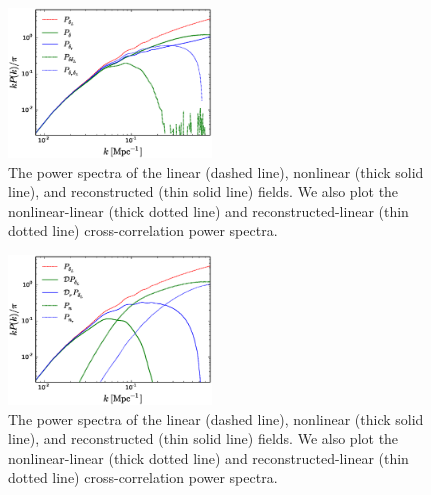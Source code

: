 \documentclass[aps,prd,twocolumn,showpacs,superscriptaddress,groupedaddress,nofootinbib]{revtex4}  %
\begin{document}
\begin{figure}[tbp]
\begin{center}
\includegraphics[width=0.48\textwidth]{f3x.eps}
\end{center}
\vspace{-0.7cm}
\caption{The power spectra of the linear (dashed line), nonlinear (thick solid
line), and reconstructed (thin solid line) fields. 
We also plot the nonlinear-linear (thick dotted line) and 
reconstructed-linear (thin dotted line) cross-correlation power spectra.}
\label{fig:ps}
\end{figure}

\begin{figure}[tbp]
\begin{center}
\includegraphics[width=0.48\textwidth]{f3xx.eps}
\end{center}
\vspace{-0.7cm}
\caption{The power spectra of the linear (dashed line), nonlinear (thick solid
line), and reconstructed (thin solid line) fields. 
We also plot the nonlinear-linear (thick dotted line) and 
reconstructed-linear (thin dotted line) cross-correlation power spectra.}
\label{fig:pn}
\end{figure}
\end{document}
